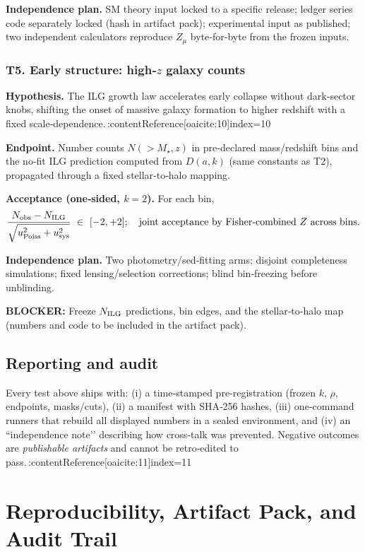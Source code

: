 \documentclass[11pt]{article}
\begin{document}
\textbf{Independence plan.} SM theory input locked to a specific release; ledger series code separately locked (hash in artifact pack); experimental input as published; two independent calculators reproduce $Z_{\mu}$ byte‑for‑byte from the frozen inputs.

\subsubsection*{T5. Early structure: high‑$z$ galaxy counts}
\textbf{Hypothesis.} The ILG growth law accelerates early collapse without dark‑sector knobs, shifting the onset of massive galaxy formation to higher redshift with a fixed scale‑dependence.\,:contentReference[oaicite:10]{index=10}

\textbf{Endpoint.} Number counts $N(>M_\star,z)$ in pre‑declared mass/redshift bins and the no‑fit ILG prediction computed from $D(a,k)$ (same constants as T2), propagated through a fixed stellar‑to‑halo mapping.

\textbf{Acceptance (one‑sided, $k=2$).} For each bin,
\[
\frac{N_{\rm obs}-N_{\rm ILG}}{\sqrt{u^{2}_{\rm Poiss}+u^{2}_{\rm sys}}}\ \in\ [-2,+2];
\quad\text{joint acceptance by Fisher‑combined $Z$ across bins}.
\]

\textbf{Independence plan.} Two photometry/sed‑fitting arms; disjoint completeness simulations; fixed lensing/selection corrections; blind bin‑freezing before unblinding.

\textbf{BLOCKER:} Freeze $N_{\rm ILG}$ predictions, bin edges, and the stellar‑to‑halo map (numbers and code to be included in the artifact pack).

\subsection{Reporting and audit}
Every test above ships with:
(i) a time‑stamped pre‑registration (frozen $k$, $\rho$, endpoints, masks/cuts),
(ii) a manifest with SHA‑256 hashes,
(iii) one‑command runners that rebuild all displayed numbers in a sealed environment, and
(iv) an “independence note’’ describing how cross‑talk was prevented. Negative outcomes are \emph{publishable artifacts} and cannot be retro‑edited to pass.\,:contentReference[oaicite:11]{index=11}

\section{Reproducibility, Artifact Pack, and Audit Trail}
\label{sec:artifacts}
\end{document}
